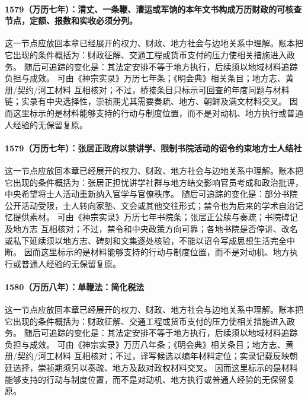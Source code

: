 \paragraph{1579（万历七年）：清丈、一条鞭、漕运或军饷的本年文书构成万历财政的可核查节点，定额、报数和实收必须分列。} 这一节点应放回本章已经展开的权力、财政、地方社会与边地关系中理解。账本把它出现的条件概括为：财政征解、交通工程或货币支付的压力使相关措施进入政务。 随后可追踪的变化是：其法定安排不等于地方执行，后续须以地域材料追踪负担与成效。 可由《神宗实录》万历七年条；《明会典》相关条目；地方志、黄册/契约/河工材料 互相核对；不过，桥接条目只标示可回查的年度问题与材料链；实录有中央选择性，崇祯期尤其需要奏疏、地方、朝鲜及满文材料交叉。 因而这里标示的是材料能够支持的行动与制度位置，而不是对动机、地方执行或普通人经验的无保留复原。

\paragraph{1579（万历七年）：张居正政府以禁讲学、限制书院活动的诏令约束地方士人结社} 这一节点应放回本章已经展开的权力、财政、地方社会与边地关系中理解。账本把它出现的条件概括为：张居正担忧讲学社群与地方结交影响官员考成和政治批评，中央希望将士人活动重新纳入官学与官僚秩序。 随后可追踪的变化是：部分书院公开活动受限，士人转向家塾、文会或其他交往形式；禁令也为后来的学术自治记忆提供素材。 可由《神宗实录》万历七年书院条；张居正公牍与奏疏；书院碑记及地方志 互相核对；不过，禁令和中央政策方向可靠；各地书院是否停讲、改名或私下延续须以地方志、碑刻和文集逐处核验，不能以诏令写成思想生活完全中断。 因而这里标示的是材料能够支持的行动与制度位置，而不是对动机、地方执行或普通人经验的无保留复原。

\paragraph{1580（万历八年）：单鞭法：简化税法} 这一节点应放回本章已经展开的权力、财政、地方社会与边地关系中理解。账本把它出现的条件概括为：财政征解、交通工程或货币支付的压力使相关措施进入政务。 随后可追踪的变化是：其法定安排不等于地方执行，后续须以地域材料追踪负担与成效。 可由《神宗实录》万历八年条；《明会典》相关条目；地方志、黄册/契约/河工材料 互相核对；不过，译写候选以编年材料定位；实录记载反映朝廷选择，崇祯期须另以奏疏、地方及敌对政权材料交叉。 因而这里标示的是材料能够支持的行动与制度位置，而不是对动机、地方执行或普通人经验的无保留复原。

